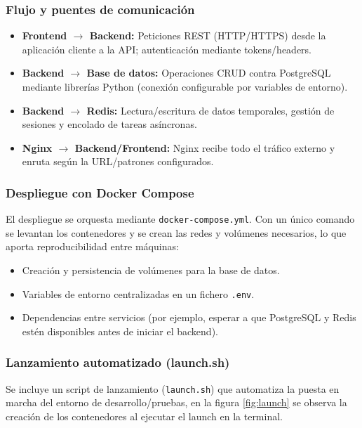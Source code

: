 \documentclass[12pt, a4paper]{article}
\begin{document}
\subsubsection{Flujo y puentes de comunicación}
\begin{itemize}
	\item \textbf{Frontend \(\rightarrow\) Backend:} Peticiones REST (HTTP/HTTPS) desde la aplicación cliente a la API; autenticación mediante tokens/headers.
	\item \textbf{Backend \(\rightarrow\) Base de datos:} Operaciones CRUD contra PostgreSQL mediante librerías Python (conexión configurable por variables de entorno).
	\item \textbf{Backend \(\rightarrow\) Redis:} Lectura/escritura de datos temporales, gestión de sesiones y encolado de tareas asíncronas.
	\item \textbf{Nginx \(\rightarrow\) Backend/Frontend:} Nginx recibe todo el tráfico externo y enruta según la URL/patrones configurados.
\end{itemize}



\subsubsection{Despliegue con Docker Compose}
El despliegue se orquesta mediante \texttt{docker-compose.yml}. Con un único comando se levantan los contenedores y se crean las redes y volúmenes necesarios, lo que aporta reproducibilidad entre máquinas:
\begin{itemize}
	\item Creación y persistencia de volúmenes para la base de datos.
	\item Variables de entorno centralizadas en un fichero \texttt{.env}.
	\item Dependencias entre servicios (por ejemplo, esperar a que PostgreSQL y Redis estén disponibles antes de iniciar el backend).
\end{itemize}

\subsubsection{Lanzamiento automatizado (launch.sh)}
Se incluye un script de lanzamiento (\texttt{launch.sh}) que automatiza la puesta en marcha del entorno de desarrollo/pruebas, en la figura \ref{fig:launch} se observa la creación de los contenedores al ejecutar el launch en la terminal. 
\end{document}

